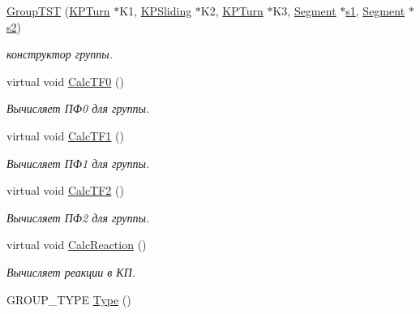 \begin{DoxyCompactItemize}
\item 
\hyperlink{class_group_t_s_t_a30a7a81170f757b682af52a934a936c9}{GroupTST} (\hyperlink{class_k_p_turn}{KPTurn} $\ast$K1, \hyperlink{class_k_p_sliding}{KPSliding} $\ast$K2, \hyperlink{class_k_p_turn}{KPTurn} $\ast$K3, \hyperlink{class_segment}{Segment} $\ast$\hyperlink{class_group2_a030b303d13894d1b4cc3fff13d0730e3}{s1}, \hyperlink{class_segment}{Segment} $\ast$\hyperlink{class_group2_aa48298daf05b4db8436dedf8d7b151ef}{s2})
\begin{DoxyCompactList}\small\item\em конструктор группы. \item\end{DoxyCompactList}\item 
virtual void \hyperlink{class_group_t_s_t_a4b999b0d1fb0f4d574713464b2d70c5b}{CalcTF0} ()
\begin{DoxyCompactList}\small\item\em Вычисляет ПФ0 для группы. \item\end{DoxyCompactList}\item 
virtual void \hyperlink{class_group_t_s_t_a90b92092e949200acef789fbcf111f7b}{CalcTF1} ()
\begin{DoxyCompactList}\small\item\em Вычисляет ПФ1 для группы. \item\end{DoxyCompactList}\item 
virtual void \hyperlink{class_group_t_s_t_a7b360b7401b921e6c15cb2301d8edd70}{CalcTF2} ()
\begin{DoxyCompactList}\small\item\em Вычисляет ПФ2 для группы. \item\end{DoxyCompactList}\item 
virtual void \hyperlink{class_group_t_s_t_a68151cc4aba39cb2748939c627563c97}{CalcReaction} ()
\begin{DoxyCompactList}\small\item\em Вычисляет реакции в КП. \item\end{DoxyCompactList}\item 
GROUP\_\-TYPE \hyperlink{class_group_t_s_t_aff5345cf0aeea3c948014fe9d9a6bf58}{Type} ()
\end{DoxyCompactItemize}
